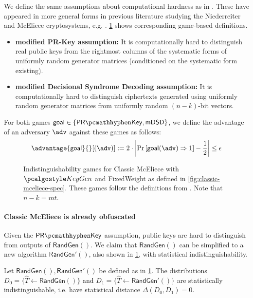 We define the same assumptions about computational hardness as in \cite[Definition~K.1]{EC:Xagawa22}. These have appeared in more general forms in previous literature studying the Niederreiter and McEliece cryptosystems, e.g. \cite{AC:CouFinSen01,EC:SaiXagYam18}. \cref{fig:classic-mceliece-assumptions} shows corresponding game-based definitions.
\begin{itemize}
    \item \textbf{modified PR-Key assumption:} It is computationally hard to distinguish real public keys from the rightmost columns of the systematic forms of uniformly random generator matrices (conditioned on the systematic form existing).
    \item \textbf{modified Decisional Syndrome Decoding assumption:} It is computationally hard to distinguish ciphertexts generated using uniformly random generator matrices from uniformly random $(n-k)$-bit vectors.
\end{itemize}

For both games $\textsf{goal} \in \{\prkey, \mdsd\}$, we define the advantage of an adversary $\adv$ against these games as follows:
\[ \advantage{\textsf{goal}}{}[(\adv)] := 2 \cdot \left| \Pr\left[\textsf{goal}(\adv) \Rightarrow 1\right] - \frac{1}{2} \right| \leq \epsilon \]

\begin{figure}
    
    \caption{Indistinguishability games for Classic McEliece with $\kgen$ and \textsf{FixedWeight} as defined in \cref{fig:classic-mceliece-spec}. These games follow the definitions from \cite[Definition~K.1]{EC:Xagawa22}. Note that $n-k = mt$.}
    \label{fig:classic-mceliece-assumptions}
\end{figure}

\paragraph{Classic McEliece is already obfuscated}

Given the $\prkey$ assumption, public keys are hard to distinguish from outputs of $\textsf{RandGen}()$. We claim that $\textsf{RandGen}()$ can be simplified to a new algorithm $\textsf{RandGen}'()$, also shown in \cref{fig:classic-mceliece-assumptions}, with statistical indistinguishability.

\begin{lemma} \label{lem:classic-mceliece-randgen-prime}
    Let $\textsf{RandGen}(), \textsf{RandGen}'()$ be defined as in \cref{fig:classic-mceliece-assumptions}.
    The distributions $D_0 = \{ \hat T \gets \textsf{RandGen}() \}$ and $D_1 = \{ \hat T \gets \textsf{RandGen}'() \}$ are statistically indistinguishable, i.e. have statistical distance $\Delta(D_0, D_1) = 0$.
\end{lemma}

